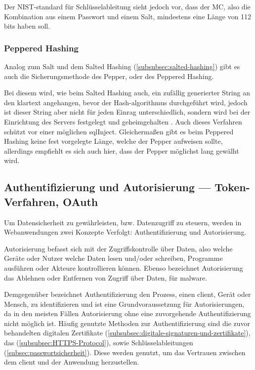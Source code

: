 Der \ac{NIST}-standard für Schlüsselableitung sieht jedoch vor, dass der \ac{MC}, also die Kombination aus einem Passwort und einem Salt, mindestens eine Länge von 112 bits haben soll.\autocite[\vglf][]{NIST:800132}

\subsubsection{Peppered Hashing}\label{subsubsec:peppered-hashing}

Analog zum Salt und dem Salted Hashing (\autoref{subsubsec:salted-hashing}) gibt es auch die Sicherungsmethode des Pepper, oder des Peppered Hashing.

Bei diesem wird, wie beim Salted Hashing auch, ein zufällig generierter String an den \gls{klartext} angehangen, bevor der Hash-\gls{algorithmus} durchgeführt wird, jedoch ist dieser String aber nicht für jeden Einrag unterschiedlich, sondern wird bei der Einrichtung des Servers festgelegt und geheimgehalten \autocite[\vglf][]{Securing39:online}. Auch dieses Verfahren schützt vor einer möglichen \gls{sqlInject}.
Gleichermaßen gibt es beim Peppered Hashing keine fest vorgelegte Länge, welche der Pepper aufweisen sollte, allerdings empfiehlt es sich auch hier, dass der Pepper möglichst lang gewälht wird.


\subsection[Authentifizierung und Autorisierung]{Authentifizierung und Autorisierung — Token-Verfahren, OAuth}\label{subsec:authenticationAuthorization}
Um Datensicherheit zu gewährleisten, bzw. Datenzugriff zu steuern, werden in Webanwendungen zwei Konzepte Verfolgt: Authentifizierung und Autorisierung. 

Autorisierung befasst sich mit der Zugriffskontrolle über Daten, also welche Geräte oder Nutzer welche Daten lesen und/oder schreiben, Programme ausführen oder Akteure kontrollieren können.\autocite[\vglf][]{Auth:2017} Ebenso bezeichnet Autorisierung das Ablehnen oder Entfernen von Zugriff über Daten, \zbol für \gls{malware}. \autocite[\vglf][]{Auth:2017}

Demgegenüber bezeichnet Authentifizierung den Prozess, einen \gls{client}, Gerät oder Mensch, zu identifizieren und ist eine Grundvoraussetzung für Autorisierungen, da in den meisten Fällen Autorisierung ohne eine zuvorgehende Authentifizierung nicht möglich ist. \autocite[\vglf][]{Auth:2017} 
Häufig genutzte Methoden zur Authentifizierung sind die zuvor behandelten digitalen Zertifikate (\autoref{subsubsec:digitale-signaturen-und-zertifikate}), das  (\autoref{subsubsec:HTTPS-Protocol}), sowie Schlüsselableitungen (\autoref{subsec:passwortsicherheit}). Diese werden genutzt, um das Vertrauen zwischen dem \gls{client} und der Anwendung herzustellen. \autocite[\vglf][]{Auth:2017}


